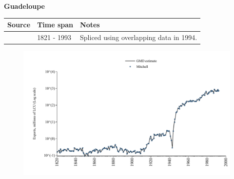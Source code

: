 \documentclass[12pt,a4paper,landscape]{article}
\begin{document}
\begin{adjustbox}{max totalsize={\paperwidth}{\paperheight},center}
\begin{minipage}[t][\textheight][t]{\textwidth}
\vspace*{0.5cm}
{}
\begin{center}
{\Large\bfseries Guadeloupe}
\end{center}
\vspace{0.5cm}
\begin{table}[H]
\centering
\small
\begin{tabular}{|l|l|l|}
\hline
\textbf{Source} & \textbf{Time span} & \textbf{Notes} \\
\hline
\rowcolor{white}\cite{Mitchell}& 1821 - 1993 &Spliced using overlapping data in 1994.\\
\hline
\end{tabular}
\end{table}
\begin{figure}[H]
\centering
\includegraphics[width=\textwidth,height=0.6\textheight,keepaspectratio]{graphs/GLP_exports.pdf}
\end{figure}
\end{minipage}
\end{adjustbox}
\end{document}

